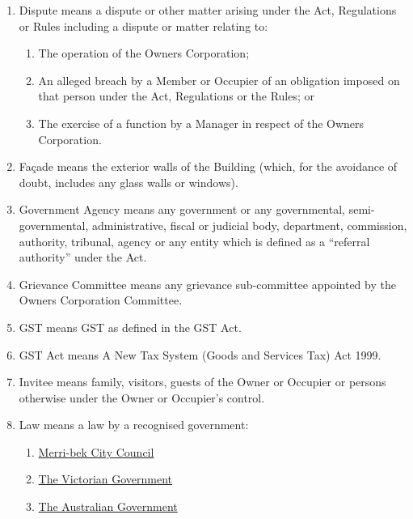 \documentclass{article}
\begin{document}
\begin{enumerate}[label=\arabic*.]
\begin{enumerate}[label=\arabic{enumi}.\arabic*.]
\begin{enumerate}[label=(\arabic*)]
\item  Dispute means a dispute or other matter arising under the Act, Regulations or Rules including a dispute or matter relating to:

\begin{enumerate}[label=(\alph*)]

\item  The operation of the Owners Corporation;

\item  An alleged breach by a Member or Occupier of an obligation imposed on that person under the Act, Regulations or the Rules; or

\item  The exercise of a function by a Manager in respect of the Owners Corporation.

\end{enumerate}

\item  Façade means the exterior walls of the Building (which, for the avoidance of doubt, includes any glass walls or windows).

\item  Government Agency means any government or any governmental, semi-governmental, administrative, fiscal or judicial body, department, commission, authority, tribunal, agency or any entity which is defined as a “referral authority” under the Act.

\item  Grievance Committee means any grievance sub-committee appointed by the Owners Corporation Committee.

\item  GST means GST as defined in the GST Act.

\item  GST Act means A New Tax System (Goods and Services Tax) Act 1999.

\item  Invitee means family, visitors, guests of the Owner or Occupier or persons otherwise under the Owner or Occupier’s control.

\item Law means a law by a recognised government:
\begin{enumerate}
    \item \href{https://www.merri-bek.vic.gov.au/}{Merri-bek City Council}
    \item \href{https://www.vic.gov.au/}{The Victorian Government}
    \item \href{https://my.gov.au/}{The Australian Government}
\end{enumerate}


\end{enumerate}
\end{enumerate}
\end{enumerate}
\end{document}
